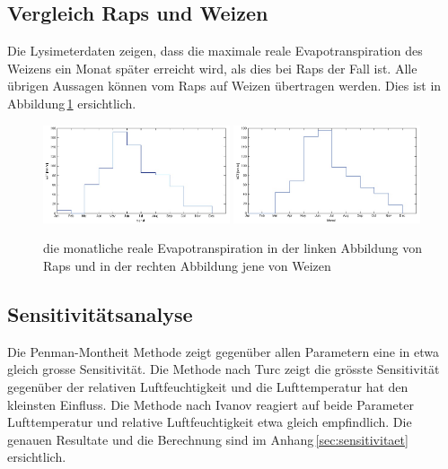 \subsection{Vergleich Raps und Weizen}
Die Lysimeterdaten zeigen, dass die maximale reale Evapotranspiration des Weizens ein Monat später erreicht wird, als dies bei Raps der Fall ist. Alle übrigen Aussagen können vom Raps auf Weizen übertragen werden. Dies ist in Abbildung\,\ref{fig:aet_m} ersichtlich.

\begin{figure}[H]
{\includegraphics[width=0.49\textwidth]{figures/lys1_aet_m.jpg}} 
{\includegraphics[width=0.49\textwidth]{figures/lys2_aet_m.jpg}} 
\caption{die monatliche reale Evapotranspiration in der linken Abbildung von Raps und in der rechten Abbildung jene von Weizen}
\label{fig:aet_m}
\end{figure} 


\subsection{Sensitivitätsanalyse}
Die Penman-Montheit Methode zeigt gegenüber allen Parametern eine in etwa gleich grosse Sensitivität. Die Methode nach Turc zeigt die grösste Sensitivität gegenüber der relativen Luftfeuchtigkeit und die Lufttemperatur hat den kleinsten Einfluss. Die Methode nach Ivanov reagiert auf beide Parameter Lufttemperatur und relative Luftfeuchtigkeit etwa gleich empfindlich. Die genauen Resultate und die Berechnung sind im Anhang\,\ref{sec:sensitivitaet} ersichtlich.